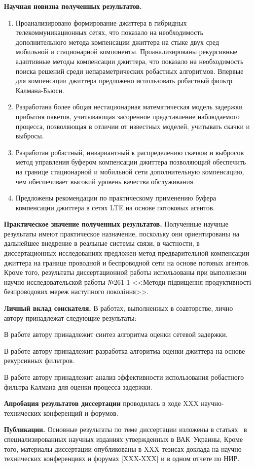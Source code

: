 \textbf{Научная новизна полученных результатов.} 
\begin{enumerate}
  \item Проанализировано формирование джиттера в гибридных телекоммуникационных сетях, что показало на необходимость дополнительного метода компенсации джиттера на стыке двух сред мобильной и стационарной компоненты.
 Проанализированы рекурсивные адаптивные методы компенсации джиттера, что показало на необходимость поиска решений среди непараметрических робастных алгоритмов. 
   Впервые для компенсации джиттера предложено использовать робастный фильтр Калмана-Бьюси.


  \item Разработана более общая нестационарная математическая модель задержки прибытия пакетов,
  учитывающая засоренное представление наблюдаемого процесса, позволяющая в отличии от известных моделей, учитывать скачки и выбросы.
  \item Разработан робастный, инвариантный к распределению скачков и выбросов метод управления буфером компенсации джиттера позволяющий обеспечить на границе стационарной и мобильной сети дополнительную компенсацию, чем обеспечивает высокий уровень качества обслуживания.
  \item Предложены рекомендации по практическому применению буфера компенсации джиттера в сетях LTE на основе потоковых агентов.
\end{enumerate}

\textbf{Практическое значение полученных результатов.} Полученные научные результаты имеют практическое назначение, поскольку они ориентированы на дальнейшее внедрение в реальные системы связи, в частности, в диссертационных исследованиях предложен метод предварительной компенсации джиттера на границе проводной и беспроводной сети на основе потовых агентов.
Кроме того, результаты диссертационной работы использованы при выполнении научно-исследовательской работы №261-1 <<Методи підвищення продуктивності безпроводових мереж наступного покоління>>.


\textbf{Личный вклад соискателя.} В работах, выполненных в соавторстве, лично автору принадлежат следующие результаты: 

В работе \cite{my1} автору принадлежит синтез алгоритма оценки сетевой задержки.

В работе \cite{my2} автору принадлежит разработка алгоритма оценки джиттера на основе рекурсивных фильтров.

В работе \cite{my4} автору принадлежит анализ эффективности использования робастного фильтра Калмана для оценки процесса задержки.

\textbf{Апробация результатов диссертации} проводилась в ходе XXX научно-технических конференций и форумов. 


\textbf{Публикации.} Основные результаты по теме диссертации изложены в статьях~\cite{my1,my2,my3,my4,my5} в специализированных научных изданиях утвержденных в ВАК~Украины, Кроме того, материалы диссертации опубликованы в XXX тезисах доклада на научно-технических конференциях и форумах [XXX-XXX] и в одном отчете по НИР.


\clearpage
